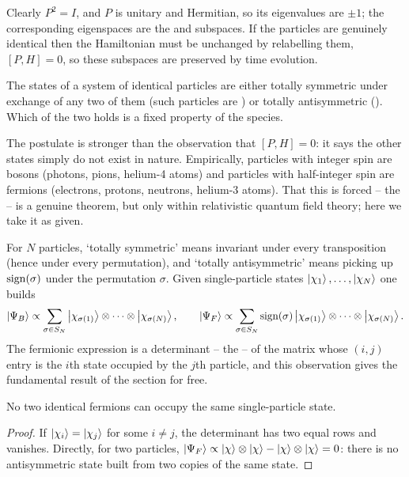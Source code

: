 \documentclass[a4paper]{scrartcl}
\begin{document}
Clearly $P^2 = I$, and $P$ is unitary and Hermitian, so its eigenvalues are $\pm1$; the corresponding eigenspaces are the  and  subspaces. If the particles are genuinely identical then the Hamiltonian must be unchanged by relabelling them, $[P, H] = 0$, so these subspaces are preserved by time evolution.

\begin{axiom}
    The states of a system of identical particles are either totally symmetric under exchange of any two of them (such particles are ) or totally antisymmetric (). Which of the two holds is a fixed property of the species.
\end{axiom}

The postulate is stronger than the observation that $[P,H] = 0$: it says the other states simply do not exist in nature. Empirically, particles with integer spin are bosons (photons, pions, helium-4 atoms) and particles with half-integer spin are fermions (electrons, protons, neutrons, helium-3 atoms). That this is forced -- the  -- is a genuine theorem, but only within relativistic quantum field theory; here we take it as given.

For $N$ particles, `totally symmetric' means invariant under every transposition (hence under every permutation), and `totally antisymmetric' means picking up $\operatorname{sign}(\sigma)$ under the permutation $\sigma$. Given single-particle states $\ket{\chi_1},\dots,\ket{\chi_N}$ one builds
$$
\ket{\Psi_B} \propto \sum_{\sigma \in S_N}\ket{\chi_{\sigma(1)}}\otimes\cdots\otimes\ket{\chi_{\sigma(N)}}, \qquad
\ket{\Psi_F} \propto \sum_{\sigma\in S_N}\operatorname{sign}(\sigma)\ket{\chi_{\sigma(1)}}\otimes\cdots\otimes\ket{\chi_{\sigma(N)}}.
$$
The fermionic expression is a determinant -- the  -- of the matrix whose $(i,j)$ entry is the $i$th state occupied by the $j$th particle, and this observation gives the fundamental result of the section for free.

\begin{theorem}
    No two identical fermions can occupy the same single-particle state.
\end{theorem}
\begin{proof}
    If $\ket{\chi_i} = \ket{\chi_j}$ for some $i\neq j$, the determinant has two equal rows and vanishes. Directly, for two particles, $\ket{\Psi_F} \propto \ket{\chi}\otimes\ket{\chi} - \ket{\chi}\otimes\ket{\chi} = 0$: there is no antisymmetric state built from two copies of the same state.
\end{proof}
\end{document}

